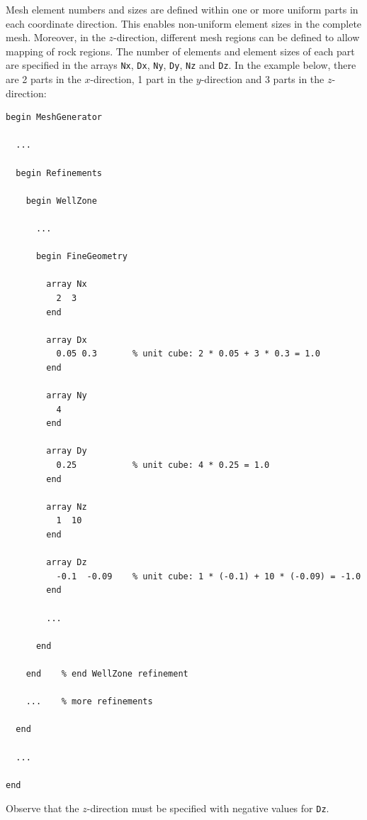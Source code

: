 \label{sec:lgr-sizes}

Mesh element numbers and sizes are defined within one or more uniform
parts in each coordinate direction. This enables non-uniform element
sizes in the complete mesh. Moreover, in the $z$-direction, different
mesh regions can be defined to allow mapping of rock regions. The
number of elements and element sizes of each part are specified in the
arrays \texttt{Nx}, \texttt{Dx}, \texttt{Ny}, \texttt{Dy}, \texttt{Nz}
and \texttt{Dz}. In the example below, there are 2 parts in the
$x$-direction, 1 part in the $y$-direction and 3 parts in the
$z$-direction:

\begin{verbatim}
begin MeshGenerator

  ... 

  begin Refinements

    begin WellZone

      ... 

      begin FineGeometry
    
        array Nx
          2  3
        end
    
        array Dx
          0.05 0.3       % unit cube: 2 * 0.05 + 3 * 0.3 = 1.0
        end              
                         
        array Ny         
          4              
        end              
                         
        array Dy         
          0.25           % unit cube: 4 * 0.25 = 1.0 
        end              
                         
        array Nz         
          1  10          
        end              
                         
        array Dz         
          -0.1  -0.09    % unit cube: 1 * (-0.1) + 10 * (-0.09) = -1.0
        end
    
        ... 
    
      end

    end    % end WellZone refinement

    ...    % more refinements

  end

  ... 
    
end
\end{verbatim}
%
Observe that the $z$-direction must be specified with negative values
for \texttt{Dz}. 

%
\label{sec:lgr-regionmapping}

